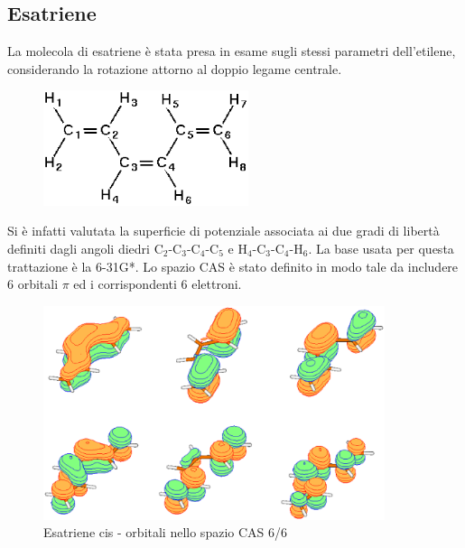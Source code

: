 \subsection{Esatriene}

La molecola di esatriene \`e stata presa in esame sugli stessi parametri
dell'etilene, considerando la rotazione attorno al doppio legame centrale.

\begin{figure}[ht]
\begin{center}
\includegraphics[angle=0,width=6cm,keepaspectratio]{immagini/esatriene/esatriene_cis.eps}
\end{center}
\end{figure}

Si \`e infatti valutata la superficie di potenziale associata ai due gradi di libert\`a
definiti dagli angoli diedri \mbox{C$_2$-C$_3$-C$_4$-C$_5$} e \mbox{H$_4$-C$_3$-C$_4$-H$_6$}.
La base usata per questa trattazione \`e la {6-31G*}. Lo spazio CAS \`e stato
definito in modo tale da includere 6 orbitali $\pi$ ed i corrispondenti
6 elettroni.
\begin{figure}[ht]
\begin{center}
\includegraphics[angle=0,width=10cm,keepaspectratio]{immagini/esatriene/orbitali.eps}
\caption{\small Esatriene cis - orbitali nello spazio CAS 6/6}
\label{fig:esatriene_orbitali}
\end{center}
\end{figure}

\clearpage

